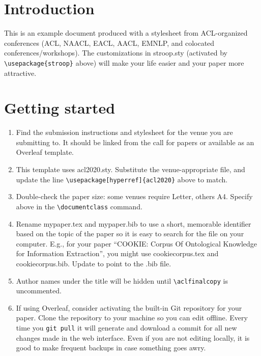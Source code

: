 %

\section{Introduction}
This is an example document produced with a stylesheet from
ACL-organized conferences (ACL, NAACL, EACL, AACL, EMNLP, and
colocated conferences/workshops).
The customizations in stroop.sty (activated by \verb|\usepackage{stroop}| above)
will make your life easier and your paper more attractive.

\section{Getting started}

\begin{enumerate}
    \item Find the submission instructions and stylesheet for the venue you are submitting to. It should be linked from the call for papers or available as an Overleaf template.
    \item This template uses acl2020.sty. Substitute the venue-appropriate file, and update the line \verb|\usepackage[hyperref]{acl2020}| above to match.
    \item Double-check the paper size: some venues require Letter, others A4.
    Specify above in the \verb|\documentclass| command.
    \item Rename mypaper.tex and mypaper.bib to use a short, memorable identifier based on the topic of the paper so it is easy to search for the file on your computer. E.g., for your paper ``COOKIE: Corpus Of Ontological Knowledge for Information Extraction'', you might use cookiecorpus.tex and \mbox{cookiecorpus.bib}. Update \verb|| to point to the .bib file.
    \item Author names under the title will be hidden until \verb|\aclfinalcopy| is uncommented.
    \item If using Overleaf, consider activating the built-in Git repository for your paper. Clone the repository to your machine so you can edit offline. Every time you \verb|git pull| it will generate and download a commit for all new changes made in the web interface. Even if you are not editing locally, it is good to make frequent backups in case something goes awry.
\end{enumerate}

